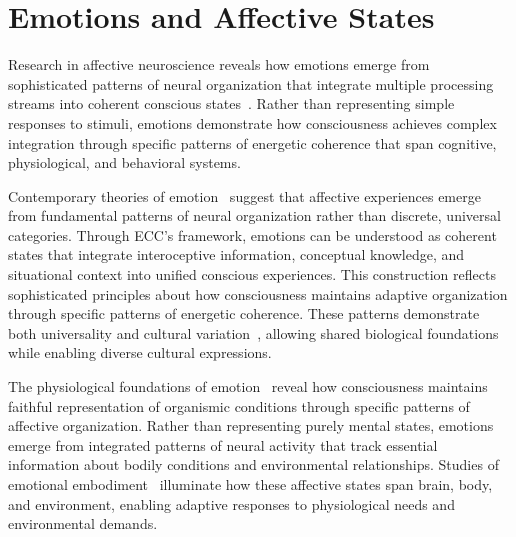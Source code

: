 \section{Emotions and Affective States}

Research in affective neuroscience reveals how emotions emerge from sophisticated patterns of neural organization that integrate multiple processing streams into coherent conscious states~\cite{Panksepp1998, pinotsis2023cytoelectric}. Rather than representing simple responses to stimuli, emotions demonstrate how consciousness achieves complex integration through specific patterns of energetic coherence that span cognitive, physiological, and behavioral systems.

Contemporary theories of emotion~\cite{barrett2017emotions, kukushkin2024massed} suggest that affective experiences emerge from fundamental patterns of neural organization rather than discrete, universal categories. Through ECC's framework, emotions can be understood as coherent states that integrate interoceptive information, conceptual knowledge, and situational context into unified conscious experiences. This construction reflects sophisticated principles about how consciousness maintains adaptive organization through specific patterns of energetic coherence. These patterns demonstrate both universality and cultural variation~\cite{Lutz1988, van2025processes}, allowing shared biological foundations while enabling diverse cultural expressions.

The physiological foundations of emotion~\cite{Damasio2018, bosl2025dynamical} reveal how consciousness maintains faithful representation of organismic conditions through specific patterns of affective organization. Rather than representing purely mental states, emotions emerge from integrated patterns of neural activity that track essential information about bodily conditions and environmental relationships. Studies of emotional embodiment~\cite{Fuchs2019, pinotsis2023cytoelectric} illuminate how these affective states span brain, body, and environment, enabling adaptive responses to physiological needs and environmental demands.


